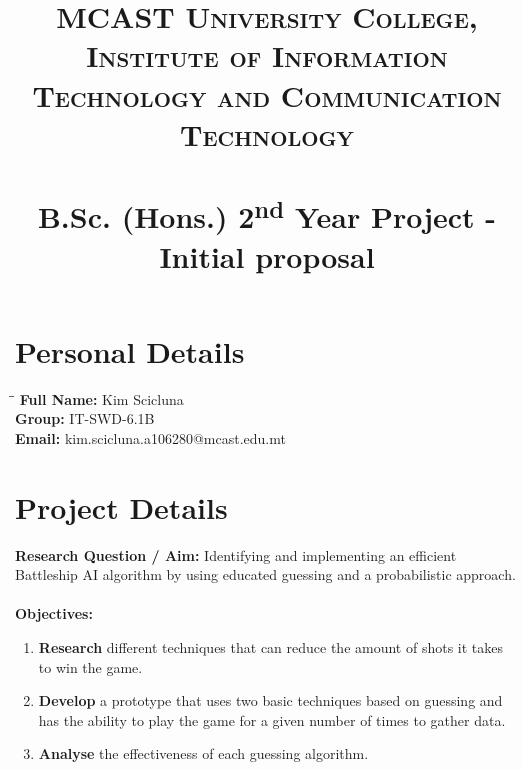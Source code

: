 \documentclass[paper=a4, fontsize=11pt]{scrartcl}
\title{	
\normalfont \normalsize 
\textsc{MCAST University College, \\Institute of Information Technology and Communication Technology} \\ [25pt] 
\horrule{0.5pt} \\[0.4cm]
\huge B.Sc. (Hons.) 2\textsuperscript{nd} Year Project - Initial proposal
\horrule{2pt} \\[0.5cm] 
}
\numberwithin{equation}{section} %
\numberwithin{figure}{section} %
\numberwithin{table}{section} %
\begin{document}
\maketitle

\section{Personal Details}

\begin{tabbing}
\hspace*{2cm}\=\hspace*{3cm}\= \kill
\textbf{Full Name:} \> Kim Scicluna\\
\textbf{Group:} \> IT-SWD-6.1B\\
\textbf{Email:} \> kim.scicluna.a106280@mcast.edu.mt\\
\end{tabbing}

\section{Project Details}

\textbf{Research Question / Aim:} Identifying and implementing an efficient Battleship AI algorithm by using educated guessing and a probabilistic approach.\\\\
\textbf{Objectives:} 
\begin{enumerate}
	\item \textbf{Research} different techniques that can reduce the amount of shots it takes to win the game.
	\item \textbf{Develop} a prototype that uses two basic techniques based on guessing and has the ability to play the game for a given number of times to gather data.
	\item \textbf{Analyse} the effectiveness of each guessing algorithm.
\end{enumerate}
\end{document}
